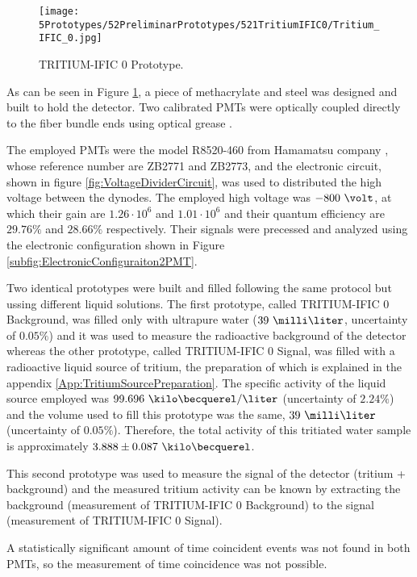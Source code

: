 \begin{figure}[h]
\centering
\texttt{[image: 5Prototypes/52PreliminarPrototypes/521TritiumIFIC0/Tritium\_IFIC\_0.jpg]}
\caption{TRITIUM-IFIC 0 Prototype.\label{fig:TritiumIFIC0}}
\end{figure}

As can be seen in Figure \ref{fig:TritiumIFIC0}, a piece of methacrylate and steel was designed and built to hold the detector. Two calibrated PMTs were optically coupled directly to the fiber bundle ends using optical grease \cite{OpticalGrease}.

The employed PMTs were the model R8520-460 from Hamamatsu company \cite{DataSheetPMTs}, whose reference number are ZB2771 and ZB2773, and the electronic circuit, shown in figure \ref{fig:VoltageDividerCircuit}, was used to distributed the high voltage between the dynodes. The employed high voltage was $-800~\volt$, at which their gain are $1.26 \cdot{} 10^6$ and $1.01 \cdot{} 10^6$ and their quantum efficiency are $29.76\%$ and $28.66\%$ respectively. Their signals were precessed and analyzed using the electronic configuration shown in Figure \ref{subfig:ElectronicConfiguraiton2PMT}.

Two identical prototypes were built and filled following the same protocol but ussing different liquid solutions. The first prototype, called TRITIUM-IFIC 0 Background, was filled only with  ultrapure water ($39~\milli\liter$, uncertainty of $0.05\%$) and it was used to measure the radioactive background of the detector whereas the other prototype, called TRITIUM-IFIC 0 Signal, was filled with a radioactive liquid source of tritium, the preparation of which is explained in the appendix \ref{App:TritiumSourcePreparation}. The specific activity of the liquid source employed was $99.696~\kilo\becquerel/\liter$ (uncertainty of $2.24\%$) and the volume used to fill this prototype was the same, $39~\milli\liter$ (uncertainty of $0.05\%$). Therefore, the total activity of this tritiated water sample is approximately $3.888 \pm 0.087~\kilo\becquerel$. 

This second prototype was used to measure the signal of the detector (tritium + background) and the measured tritium activity can be known by extracting the background (measurement of TRITIUM-IFIC 0 Background) to the signal (measurement of TRITIUM-IFIC 0 Signal).

A statistically significant amount of time coincident events was not found in both PMTs, so the measurement of time coincidence was not possible. 

